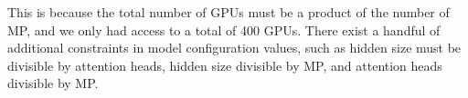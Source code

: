 This is because the total number of GPUs must be a product of the number of MP, and we only had access to a total of 400 GPUs. There exist a handful of additional constraints in model configuration values, such as hidden size must be divisible by attention heads, hidden size divisible by MP, and attention heads divisible by MP.